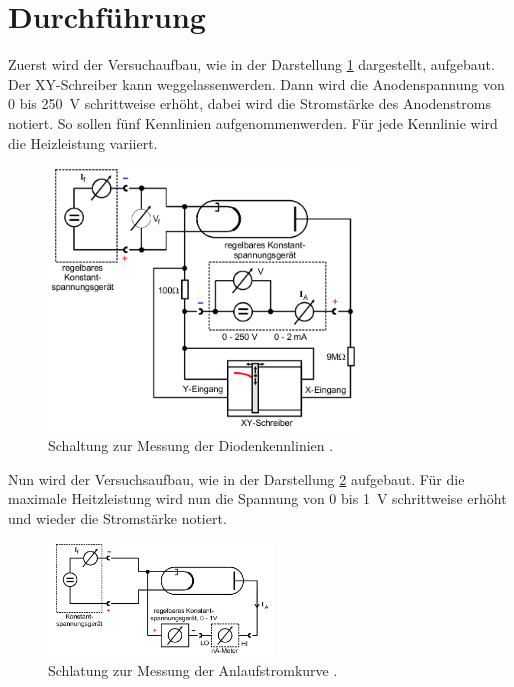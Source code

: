 \section{Durchführung}
\label{sec:Durchführung}
Zuerst wird der Versuchaufbau, wie in der Darstellung \ref{fig:SDL} dargestellt,
aufgebaut. Der XY-Schreiber kann weggelassenwerden.
Dann wird die Anodenspannung von 0 bis \SI{250}{\volt} schrittweise
erhöht, dabei wird die Stromstärke des Anodenstroms notiert.
So sollen fünf Kennlinien aufgenommenwerden. Für jede Kennlinie wird die
Heizleistung variiert. \\
\begin{figure}
  \centering
  \includegraphics[height=7cm]{logos/Schaltung-Diodenkennlinie.png}
  \caption{Schaltung zur Messung der Diodenkennlinien \cite{Anleitung}.}
  \label{fig:SDL}
\end{figure}
Nun wird der Versuchsaufbau, wie in der Darstellung \ref{fig:SAK} aufgebaut.
Für die maximale Heitzleistung wird nun die Spannung von 0 bis \SI{1}{\volt}
schrittweise erhöht und wieder die Stromstärke notiert.

\begin{figure}
  \centering
  \includegraphics[height=3cm]{logos/Schaltung-Anlaufstromkurve.png}
  \caption{Schlatung zur Messung der Anlaufstromkurve \cite{Anleitung}.}
  \label{fig:SAK}
\end{figure}
